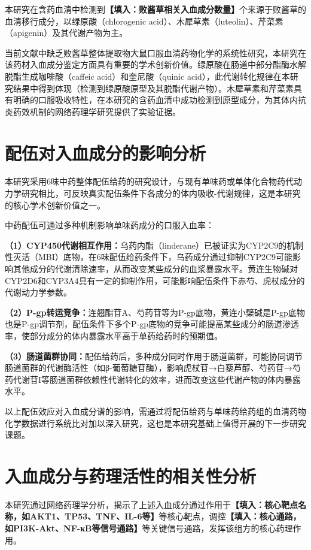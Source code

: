 \documentclass[12pt,a4paper,UTF8,openany]{ctexbook}
\begin{document}
本研究在含药血清中检测到\textbf{【填入：败酱草相关入血成分数量】}个来源于败酱草的血清移行成分，以绿原酸（chlorogenic acid）、木犀草素（luteolin）、芹菜素（apigenin）及其代谢产物为主。

当前文献中缺乏败酱草整体提取物大鼠口服血清药物化学的系统性研究，本研究在该药材入血成分鉴定方面具有重要的学术创新价值。绿原酸在肠道中部分酯酶水解脱酯生成咖啡酸（caffeic acid）和奎尼酸（quinic acid），此代谢转化规律在本研究结果中得到体现（检测到绿原酸原型及其脱酯代谢产物）。木犀草素和芹菜素具有明确的口服吸收特性，在本研究的含药血清中成功检测到原型成分，为其体内抗炎药效机制的网络药理学研究提供了实验证据\cite{Gong2021}。

\section{配伍对入血成分的影响分析}

本研究采用6味中药整体配伍给药的研究设计，与现有单味药或单体化合物药代动力学研究相比，可反映真实配伍条件下各成分的体内吸收-代谢规律，这是本研究的核心学术创新价值之一。

中药配伍可通过多种机制影响单味药成分的口服入血率：

\textbf{（1）CYP450代谢相互作用：}乌药内酯（linderane）已被证实为CYP2C9的机制性灭活（MBI）底物\cite{Dai2017}，在6味配伍给药条件下，乌药成分通过抑制CYP2C9可能影响其他成分的代谢清除速率，从而改变某些成分的血浆暴露水平。黄连生物碱对CYP2D6和CYP3A4具有一定的抑制作用，可能影响配伍条件下赤芍、虎杖成分的代谢动力学参数。

\textbf{（2）P-gp转运竞争：}连翘酯苷A、芍药苷等为P-gp底物，黄连小檗碱是P-gp底物也是P-gp调节剂\cite{FengX2021,Molecules2022}，配伍条件下多个P-gp底物的竞争可能提高某些成分的肠道渗透率，使部分成分的体内暴露水平高于单药给药时的预期值。

\textbf{（3）肠道菌群协同：}配伍给药后，多种成分同时作用于肠道菌群，可能协同调节肠道菌群的代谢酶活性（如β-葡萄糖苷酶），影响虎杖苷→白藜芦醇、芍药苷→芍药代谢苷I等肠道菌群依赖性代谢转化的效率，进而改变这些代谢产物的体内暴露水平。

以上配伍效应对入血成分谱的影响，需通过将配伍给药与单味药给药组的血清药物化学数据进行系统比对加以深入研究，这也是本研究基础上值得开展的下一步研究课题。

\section{入血成分与药理活性的相关性分析}

本研究通过网络药理学分析，揭示了上述入血成分通过作用于\textbf{【填入：核心靶点名称，如AKT1、TP53、TNF、IL-6等】}等核心靶点，调控\textbf{【填入：核心通路，如PI3K-Akt、NF-κB等信号通路】}等关键信号通路，发挥该组方的核心药理作用。
\end{document}
